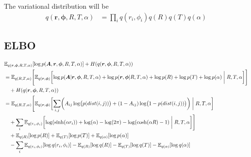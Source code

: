 \documentclass{article}
\renewcommand{\v}[1]{\bm{#1}}
\newcommand{\E}{\mathbb{E}}
\begin{document}
The variational distribution will be
\begin{equation}
\begin{split}
q(\v{r}, \v{\phi}, R,T,\alpha)
&= \prod_i q(r_i,\phi_i) q(R) q(T) q(\alpha)
\end{split}
\end{equation}

\subsection{ELBO}
\begin{equation}
\begin{aligned}
& \E_{q(\v{r}, \v{\phi}, R,T,\alpha)}[\log p(\v{A}, \v{r}, \v{\phi}, R,T,\alpha)] + H(q(\v{r}, \v{\phi}, R,T,\alpha)) \\ 
&= \E_{q( R,T,\alpha)} \Biggl[ 
\E_{q(\v{r}, \v{\phi})} \biggl[ \log p(\v{A} | \v{r}, \v{\phi}, R,T,\alpha) 
+ \log p(\v{r}, \v{\phi} | R,T,\alpha) +\log p(R) + \log p(T) + \log p(\alpha) \biggm\vert R,T,\alpha \biggr] \Biggr]\\ 
& \quad + H(q(\v{r}, \v{\phi}, R,T,\alpha)) \\
&= \E_{q( R,T,\alpha)} \Biggl[ 
\E_{q(\v{r}, \v{\phi})} \biggl[ 
\sum_{i,j} \biggl( A_{ij} \log \bigl(p(dist(i,j))\bigr) + (1-A_{ij}) \log \bigl(1 - p(dist(i,j))\bigr) \biggr) \biggm\vert R,T,\alpha \biggr]\\
& \quad+ \sum_i \E_{q(r_i,\phi_i)} \biggl[ \log(\sinh(\alpha r_i)) + \log(\alpha) - \log(2\pi) -\log(\cosh(\alpha R) -1) \biggm\vert R,T,\alpha \biggr] \Biggr]\\ 
& \quad +\E_{q(R)}[\log p(R)] + \E_{q(T)}[\log p(T)] + \E_{q(\alpha)}[\log p(\alpha)]\\
& \quad - \sum_i \E_{q(r_i,\phi_i)} [\log q(r_i,\phi_i)] - \E_{q(R)}[\log q(R)] - \E_{q(T)}[\log q(T)] - \E_{q(\alpha)}[\log q(\alpha)]  \\
\end{aligned}
\end{equation}
\end{document}
